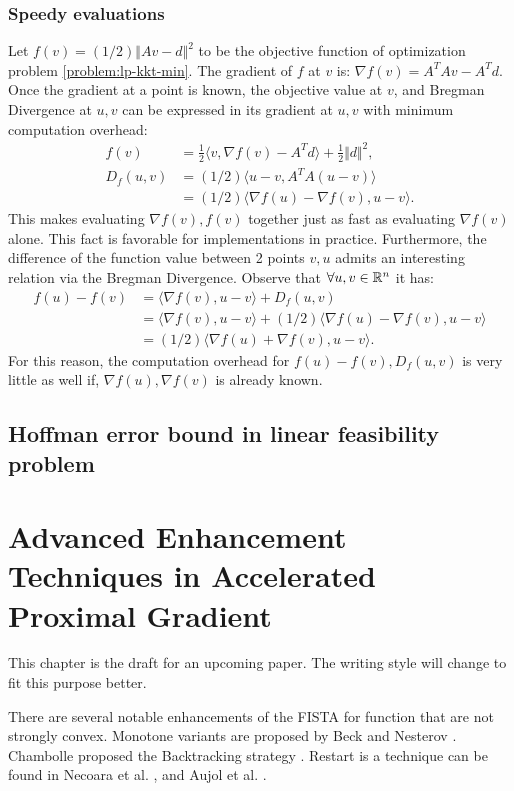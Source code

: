 \documentclass[12pt]{report}
\begin{document}
        \subsection{Speedy evaluations}
            Let $f(v) = (1/2)\Vert Av - d\Vert^2$ to be the objective function of optimization problem \eqref{problem:lp-kkt-min}. 
            The gradient of $f$ at $v$ is: $\nabla f(v) = A^TAv - A^Td$. 
            Once the gradient at a point is known, the objective value at $v$, and Bregman Divergence at $u, v$ can be expressed in its gradient at $u, v$ with minimum computation overhead: 
            \begin{align*}
                f(v) &= 
                \frac{1}{2}\langle v, \nabla f(v) - A^Td\rangle + \frac{1}{2}\Vert d\Vert^2, 
                \\
                D_f(u, v) &= (1/2)\langle u - v, A^TA (u - v)\rangle
                \\
                &= (1/2)\langle \nabla f(u) - \nabla f(v), u - v\rangle. 
            \end{align*}
            This makes evaluating $\nabla f(v), f(v)$ together just as fast as evaluating $\nabla f(v)$ alone.
            This fact is favorable for implementations in practice. 
            Furthermore, the difference of the function value between 2 points $v, u$ admits an interesting relation via the Bregman Divergence. 
            Observe that $\forall u, v \in \mathbb R^n$ it has: 
            \begin{align*}
                f(u) - f(v) &= \langle \nabla f(v), u - v \rangle + D_f(u, v)
                \\
                &= \langle \nabla f(v), u - v \rangle + (1/2)\langle \nabla f(u) - \nabla f(v), u - v\rangle
                \\
                &= (1/2)\langle \nabla f(u) + \nabla f(v), u - v\rangle. 
            \end{align*}
            For this reason, the computation overhead for $f(u) - f(v), D_f(u, v)$ is very little as well if, $\nabla f(u), \nabla f(v)$ is already known.
    \section{Hoffman error bound in linear feasibility problem}

\chapter{Advanced Enhancement Techniques in Accelerated Proximal Gradient}
    This chapter is the draft for an upcoming paper. 
    The writing style will change to fit this purpose better. 
    \par
    There are several notable enhancements of the FISTA for function that are not strongly convex. 
    Monotone variants are proposed by Beck \cite{beck_fast_2009-1} and Nesterov \cite[2.2.32]{nesterov_lectures_2018}. 
    Chambolle proposed the Backtracking strategy \cite{calatroni_backtracking_2019}.
    Restart is a technique can be found in Necoara et al. \cite{necoara_linear_2019}, \cite{alamo_restart_2019} and Aujol et al. \cite{aujol_parameter-free_2024}. 
    
\end{document}
